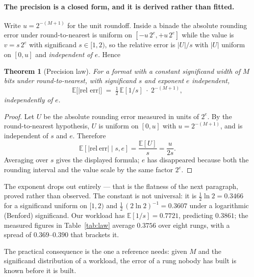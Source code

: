 \documentclass[11pt]{article}
\newtheorem{theorem}{Theorem}
\theoremstyle{definition}
\begin{document}
\paragraph{The precision is a closed form, and it is derived rather than fitted.}
Write $u = 2^{-(M+1)}$ for the unit roundoff. Inside a binade the absolute
rounding error under round-to-nearest is uniform on $[-u\,2^{e}, +u\,2^{e}]$
while the value is $v = s\,2^{e}$ with significand $s \in [1,2)$, so the relative
error is $|U|/s$ with $|U|$ uniform on $[0,u]$ and \emph{independent of $e$}.
Hence
\begin{theorem}[Precision law]\label{thm:law}
For a format with a constant significand width of $M$ bits under
round-to-nearest, with significand $s$ and exponent $e$ independent,
\[
  \mathbb{E}\bigl[|\text{rel err}|\bigr] \;=\; \tfrac{1}{2}\,\mathbb{E}[1/s]\;\cdot\;2^{-(M+1)} ,
\]
independently of $e$.
\end{theorem}
\begin{proof}
Let $U$ be the absolute rounding error measured in units of $2^e$.  By the
round-to-nearest hypothesis, $U$ is uniform on $[0,u]$ with
$u=2^{-(M+1)}$, and is independent of $s$ and $e$.  Therefore
\[
  \mathbb{E}[|\mathrm{rel\ err}|\mid s,e]
  = \frac{\mathbb{E}[U]}{s}
  = \frac{u}{2s}.
\]
Averaging over $s$ gives the displayed formula; $e$ has disappeared because both
the rounding interval and the value scale by the same factor $2^e$.
\end{proof}
The exponent drops out entirely --- that is the flatness of the next paragraph,
proved rather than observed. The constant is not universal: it is
$\tfrac{1}{2}\ln 2 = 0.3466$ for a significand uniform on $[1,2)$ and
$\tfrac{1}{2}\,(2\ln 2)^{-1} = 0.3607$ under a logarithmic (Benford) significand.
Our workload has $\mathbb{E}[1/s] = 0.7721$, predicting $0.3861$; the measured
figures in Table~\ref{tab:law} average $0.3756$ over eight rungs, with a spread
of $0.369$--$0.390$ that brackets it.

The practical consequence is the one a reference needs: given $M$ and the
significand distribution of a workload, the error of a rung nobody has built is
known before it is built.
\end{document}
